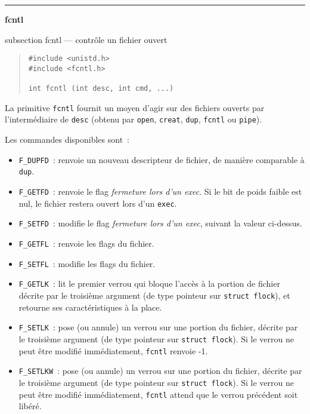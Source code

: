 \documentclass [twoside] {report}
\newcommand {\primitive} [1]
    {
	{\large \bf #1}
	\addcontentsline {toc} {subsection} {#1}
    }
\newcommand {\separation}
    {
	\vspace {7mm}
	\nopagebreak
	\hrule
    }
\begin{document}
\separation
\primitive {fcntl} --- contrôle un fichier ouvert

\begin {quote}
\begin {verbatim}
#include <unistd.h>
#include <fcntl.h>

int fcntl (int desc, int cmd, ...)
\end{verbatim}
\end {quote}

La primitive {\tt fcntl} fournit un moyen
d'agir sur des fichiers ouverts par
l'intermédiaire de
{\tt desc} (obtenu par {\tt open}, {\tt creat}, {\tt dup},
{\tt fcntl} ou {\tt pipe}).

Les commandes disponibles sont~:

\begin {itemize}
    \item {\tt F\_DUPFD}~: renvoie un nouveau descripteur de
	fichier, de manière comparable à {\tt dup}.

    \item {\tt F\_GETFD}~: renvoie le flag {\it fermeture lors
	d'un exec}. Si le bit de poids faible est nul, le
	fichier restera ouvert lors d'un {\tt exec}.

    \item {\tt F\_SETFD}~: modifie le flag {\it fermeture lors
	d'un exec}, suivant la valeur ci-dessus.

    \item {\tt F\_GETFL}~: renvoie les flags du fichier.

    \item {\tt F\_SETFL}~: modifie les flags du fichier.

    \item {\tt F\_GETLK}~:  lit le premier verrou qui bloque l'accès à
	la portion de fichier décrite par le troisième argument (de type
	pointeur sur {\tt struct flock}), et retourne ses
	caractéristiques à la place.

    \item {\tt F\_SETLK}~:  pose (ou annule) un verrou sur une portion
	du fichier, décrite par le troisième argument (de type pointeur
	sur {\tt struct flock}).  Si le verrou ne peut être modifié
	immédiatement, {\tt fcntl} renvoie -1.

    \item {\tt F\_SETLKW}~:  pose (ou annule) un verrou sur une portion
	du fichier, décrite par le troisième argument (de type pointeur
	sur {\tt struct flock}).  Si le verrou ne peut être modifié
	immédiatement, {\tt fcntl} attend que le verrou précédent soit
	libéré.

\end {itemize}
\end{document}
